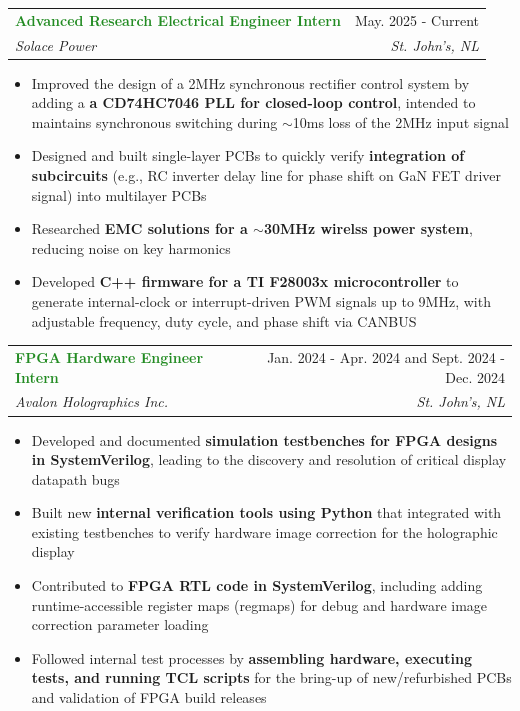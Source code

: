 \documentclass[letterpaper,11pt]{article}
\makeatletter
\newcommand{\resumeItem}[1]{
  \item\small{
    {#1 \vspace{-2pt}}
  }
}
\newcommand{\resumeSubheading}[4]{
  \vspace{-2pt}\item
    \begin{tabular*}{0.97\textwidth}[t]{l@{\extracolsep{\fill}}r}
      \textbf{\textcolor{ForestGreen}{#1}} & #2 \\
      \textit{\small#3} & \textit{\small #4} \\
    \end{tabular*}\vspace{-7pt}
}
\newcommand{\resumeItemListStart}{\begin{itemize}}
\newcommand{\resumeItemListEnd}{\end{itemize}\vspace{-5pt}}
\makeatother
\begin{document}
    \resumeSubheading
      {Advanced Research Electrical Engineer Intern}{May. 2025 - Current}
      {Solace Power}{St. John's, NL}
      \resumeItemListStart
        \resumeItem{Improved the design of a 2MHz synchronous rectifier control system by adding a \textbf{a CD74HC7046 PLL for closed-loop control}, intended to maintains synchronous 
        switching during \(\sim \)10ms loss of the 2MHz input signal}
        \resumeItem{Designed and built single-layer PCBs to quickly verify \textbf{integration of subcircuits} (e.g., RC inverter delay line for phase shift on GaN FET driver signal) into multilayer PCBs}
        \resumeItem{Researched \textbf{EMC solutions for a \(\sim \)30MHz wirelss power system}, reducing noise on key harmonics}
        \resumeItem{Developed \textbf{C++ firmware for a TI F28003x microcontroller} to generate internal-clock or interrupt-driven PWM signals up to 9MHz, 
                  with adjustable frequency, duty cycle, and phase shift via CANBUS}
      \resumeItemListEnd

    \resumeSubheading
      {FPGA Hardware Engineer Intern}{Jan. 2024 - Apr. 2024 and Sept. 2024 - Dec. 2024}
      {Avalon Holographics Inc.}{St. John's, NL}
      \resumeItemListStart
        \resumeItem{Developed and documented \textbf{simulation testbenches for FPGA designs in SystemVerilog}, leading to the discovery and resolution of 
                    critical display datapath bugs}
        \resumeItem{Built new \textbf{internal verification tools using Python} that integrated with existing testbenches to
                    verify hardware image correction for the holographic display}
        \resumeItem{Contributed to \textbf{FPGA RTL code in SystemVerilog}, including adding runtime-accessible register maps (regmaps) for debug and hardware
                    image correction parameter loading}
        \resumeItem{Followed internal test processes by \textbf{assembling hardware, executing tests, and running TCL scripts} 
                    for the bring-up of new/refurbished PCBs and validation of FPGA build releases}
      \resumeItemListEnd
\end{document}

